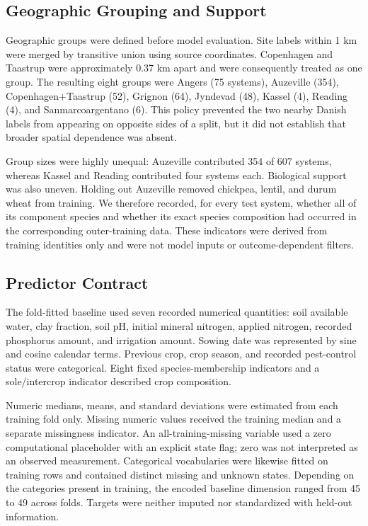 \documentclass[journal]{IEEEtran}
\begin{document}
\subsection{Geographic Grouping and Support}

Geographic groups were defined before model evaluation. Site labels within
1 km were merged by transitive union using source coordinates. Copenhagen and
Taastrup were approximately 0.37 km apart and were consequently treated as one
group. The resulting eight groups were Angers (75 systems), Auzeville (354),
Copenhagen+Taastrup (52), Grignon (64), Jyndevad (48), Kassel (4), Reading (4),
and Sanmarcoargentano (6). This policy prevented the two nearby Danish labels
from appearing on opposite sides of a split, but it did not establish that
broader spatial dependence was absent.

Group sizes were highly unequal: Auzeville contributed 354 of 607 systems,
whereas Kassel and Reading contributed four systems each. Biological support was
also uneven. Holding out Auzeville removed chickpea, lentil, and durum wheat
from training. We therefore recorded, for every test system, whether all of its
component species and whether its exact species composition had occurred in the
corresponding outer-training data. These indicators were derived from training
identities only and were not model inputs or outcome-dependent filters.

\subsection{Predictor Contract}

The fold-fitted baseline used seven recorded numerical quantities: soil
available water, clay fraction, soil pH, initial mineral nitrogen, applied
nitrogen, recorded phosphorus amount, and irrigation amount. Sowing date was
represented by sine and cosine calendar terms. Previous crop, crop season, and
recorded pest-control status were categorical. Eight fixed species-membership
indicators and a sole/intercrop indicator described crop composition.

Numeric medians, means, and standard deviations were estimated from each
training fold only. Missing numeric values received the training median and a
separate missingness indicator. An all-training-missing variable used a zero
computational placeholder with an explicit state flag; zero was not interpreted
as an observed measurement. Categorical vocabularies were likewise fitted on
training rows and contained distinct missing and unknown states. Depending on
the categories present in training, the encoded baseline dimension ranged from
45 to 49 across folds. Targets were neither imputed nor standardized with
held-out information.
\end{document}
